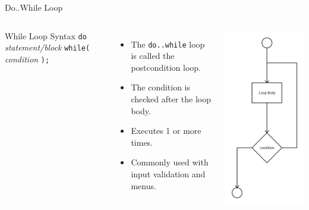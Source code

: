 \documentclass[]{beamer}
\begin{document}
\begin{frame}[fragile]{Do..While Loop}
  \begin{columns}

    \begin{block}{While Loop Syntax}
      \verb!do! 
      \newline\verb!    ! \textit{statement/block}
      \newline\verb!while(! \textit{condition} \verb!);! 
    \end{block}
    
    \vspace{0.3cm}

    \begin{itemize}[<+(1)->]
        \item The \texttt{do..while} loop is called the postcondition
        loop.
        \item The condition is checked after the loop body.
        \item Executes 1 or more times.
        \item Commonly used with input validation and menus.
    \end{itemize}

    \begin{center}
      \includegraphics[height=0.9\textheight]{images/do-while}
    \end{center}
  \end{columns}
\end{frame}
\end{document}
